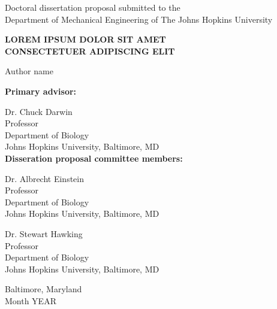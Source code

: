 \documentclass[12pt]{article}
\numberwithin{equation}{section}
\begin{document}
\vspace*{0.025in}
\thispagestyle{empty}

\begin{center}
    Doctoral dissertation proposal submitted to the \\
    Department of Mechanical Engineering of The Johns Hopkins University \\
    
    \vspace{0.75in}

    \MakeUppercase{\textbf{LOREM IPSUM DOLOR SIT AMET\\CONSECTETUER ADIPISCING ELIT}}       %
    
    \vspace{0.25in}
    
    Author name   %
\end{center}

\vspace{0.75in}

\begin{singlespace}

    \textbf{Primary advisor:}
    
    Dr. Chuck Darwin \\
    Professor \\
    Department of Biology \\
    Johns Hopkins University, Baltimore, MD \\

    \textbf{Disseration proposal committee members:} 
    
    Dr. Albrecht Einstein \\
    Professor\\
    Department of Biology \\
    Johns Hopkins University, Baltimore, MD
    
    Dr. Stewart Hawking \\
    Professor\\
    Department of Biology \\
    Johns Hopkins University, Baltimore, MD 
    
\end{singlespace}


\vspace{1in}
\begin{center}
    Baltimore, Maryland \\  %
    Month YEAR              %
\end{center}
\end{document}

